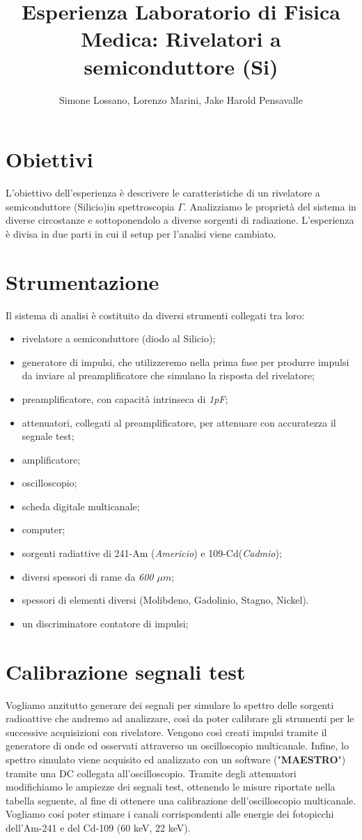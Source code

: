 \documentclass[a4paper]{article}
\title{Esperienza Laboratorio di Fisica Medica: Rivelatori a semiconduttore (Si)}
\author{Simone Lossano, Lorenzo Marini, Jake Harold Pensavalle}
\begin{document}
	\maketitle
	\tableofcontents
	\newpage
	\section{Obiettivi}
L’obiettivo dell’esperienza è descrivere le caratteristiche di un rivelatore a semiconduttore (Silicio)in spettroscopia $\Gamma$. Analizziamo le proprietà del sistema in diverse circostanze e sottoponendolo a diverse sorgenti di radiazione. L'esperienza è divisa in due parti in cui il setup per l'analisi viene cambiato.
	\section{Strumentazione}
Il sistema di analisi è costituito da diversi strumenti collegati tra loro:
\begin{itemize}
\item rivelatore a semiconduttore (diodo al Silicio);
\item generatore di impulsi, che utilizzeremo nella prima fase per produrre impulsi da inviare al
preamplificatore che simulano la risposta del rivelatore;
\item preamplificatore, con capacità intrinseca di \emph{1pF};
\item attenuatori, collegati al preamplificatore, per attenuare con accuratezza il segnale test;
\item amplificatore;
\item oscilloscopio;
\item scheda digitale multicanale;
\item computer;
\item sorgenti radiattive di 241-Am (\emph{Americio}) e 109-Cd(\emph{Cadmio});
\item diversi spessori di rame da \emph{600 $\mu m$};
\item spessori di elementi diversi (Molibdeno, Gadolinio, Stagno, Nickel).
\item un discriminatore contatore di impulsi;

\end{itemize}	
	\section{Calibrazione segnali test}
Vogliamo anzitutto generare dei segnali per simulare lo spettro delle sorgenti radioattive che andremo ad analizzare, così da poter calibrare gli strumenti per le successive acquisizioni con rivelatore. Vengono così creati impulsi tramite il generatore di onde ed osservati attraverso un oscilloscopio multicanale. Infine, lo spettro simulato viene acquisito ed analizzato con un software ("\textbf{MAESTRO}") tramite una DC collegata all'oscilloscopio.  Tramite degli attenuatori modifichiamo le ampiezze dei segnali test, ottenendo le misure riportate nella tabella seguente, al fine di ottenere una calibrazione dell'oscilloscopio multicanale. Vogliamo cos\'i poter stimare i canali corrispondenti alle energie dei fotopicchi dell'Am-241 e del Cd-109 (60 keV, 22 keV). 
	\newline
	
\end{document}
